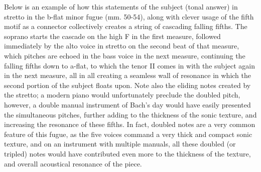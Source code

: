 Below is an example of how this statements of the subject (tonal answer)
in stretto in the b-flat minor fugue (mm. 50-54), along with clever
usage of the fifth motif as a connector collectively creates a string of
cascading falling fifths. The soprano starts the cascade on the high F
in the first measure, followed immediately by the alto voice in stretto
on the second beat of that measure, which pitches are echoed in the bass
voice in the next measure, continuing the falling fifths down to a-flat,
to which the tenor II comes in with the subject again in the next
measure, all in all creating a seamless wall of resonance in which the
second portion of the subject floats upon. Note also the eliding notes
created by the stretto; a modern piano would unfortunately preclude the
doubled pitch, however, a double manual instrument of Bach's day would
have easily presented the simultaneous pitches, further adding to the
thickness of the sonic texture, and increasing the resonance of these
fifths. In fact, doubled notes are a very common feature of this fugue,
as the five voices command a very thick and compact sonic texture, and
on an instrument with multiple manuals, all these doubled (or tripled)
notes would have contributed even more to the thickness of the texture,
and overall acoustical resonance of the piece.



